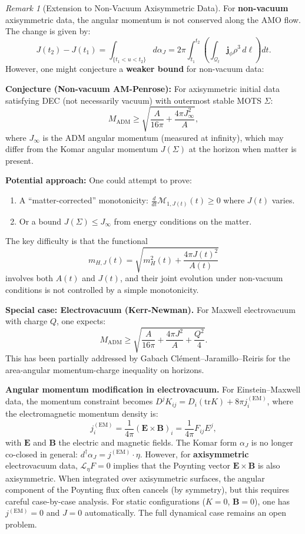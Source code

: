 \documentclass[12pt]{article}
\theoremstyle{plain}
\theoremstyle{definition}
\theoremstyle{remark}
\newtheorem{remark}[theorem]{Remark}
\newcommand{\ADM}{\mathrm{ADM}}
\newcommand{\tr}{\mathrm{tr}}
\newcommand{\momdens}{\boldsymbol{j}}
\begin{document}
\begin{remark}[Extension to Non-Vacuum Axisymmetric Data]\label{rem:non-vacuum}
For \textbf{non-vacuum} axisymmetric data, the angular momentum is not conserved along the AMO flow. The change is given by:
\[
J(t_2) - J(t_1) = \int_{\{t_1 < u < t_2\}} d\alpha_J = 2\pi \int_{t_1}^{t_2} \left(\int_{\mathcal{Q}_t} \momdens_\phi \rho^3 \, d\ell\right) dt.
\]
However, one might conjecture a \textbf{weaker bound} for non-vacuum data:

\textbf{Conjecture (Non-vacuum AM-Penrose):} For axisymmetric initial data satisfying DEC (not necessarily vacuum) with outermost stable MOTS $\Sigma$:
\[
M_{\ADM} \geq \sqrt{\frac{A}{16\pi} + \frac{4\pi J_{\infty}^2}{A}},
\]
where $J_\infty$ is the ADM angular momentum (measured at infinity), which may differ from the Komar angular momentum $J(\Sigma)$ at the horizon when matter is present.

\textbf{Potential approach:} One could attempt to prove:
\begin{enumerate}
    \item A ``matter-corrected'' monotonicity: $\frac{d}{dt}\mathcal{M}_{1,J(t)}(t) \geq 0$ where $J(t)$ varies.
    \item Or a bound $J(\Sigma) \leq J_\infty$ from energy conditions on the matter.
\end{enumerate}

The key difficulty is that the functional
\[
m_{H,J}(t) = \sqrt{m_H^2(t) + \frac{4\pi J(t)^2}{A(t)}}
\]
involves both $A(t)$ and $J(t)$, and their joint evolution under non-vacuum conditions is not controlled by a simple monotonicity.

\textbf{Special case: Electrovacuum (Kerr-Newman).} For Maxwell electrovacuum with charge $Q$, one expects:
\[
M_{\ADM} \geq \sqrt{\frac{A}{16\pi} + \frac{4\pi J^2}{A} + \frac{Q^2}{4}}.
\]
This has been partially addressed by Gabach Cl\'ement--Jaramillo--Reiris \cite{gabachclement2015} for the area-angular momentum-charge inequality on horizons.

\textbf{Angular momentum modification in electrovacuum.} For Einstein--Maxwell data, the momentum constraint becomes $D^j K_{ij} = D_i(\tr K) + 8\pi j_i^{(\mathrm{EM})}$, where the electromagnetic momentum density is:
\[
j_i^{(\mathrm{EM})} = \frac{1}{4\pi}(\mathbf{E} \times \mathbf{B})_i = \frac{1}{4\pi}F_{ij}E^j,
\]
with $\mathbf{E}$ and $\mathbf{B}$ the electric and magnetic fields. The Komar form $\alpha_J$ is no longer co-closed in general: $d^\dagger\alpha_J = j^{(\mathrm{EM})} \cdot \eta$. However, for \textbf{axisymmetric} electrovacuum data, $\mathcal{L}_\eta F = 0$ implies that the Poynting vector $\mathbf{E} \times \mathbf{B}$ is also axisymmetric. When integrated over axisymmetric surfaces, the angular component of the Poynting flux often cancels (by symmetry), but this requires careful case-by-case analysis. For static configurations ($K = 0$, $\mathbf{B} = 0$), one has $j^{(\mathrm{EM})} = 0$ and $J = 0$ automatically. The full dynamical case remains an open problem.
\end{remark}
\end{document}
